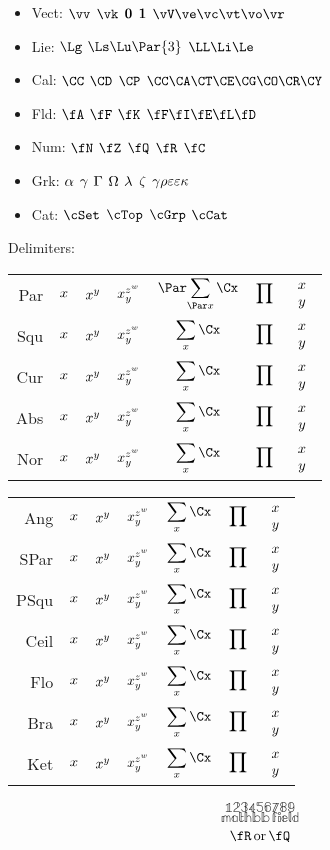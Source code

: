 \documentclass[11pt]{article}
\begin{document}
\mkPsetTitle{}

\newcommand{\alphabet}{Aa\,Bb\,Cc\,Dd\,Ee\,Ff\,Gg\,Hh\,Ii\,Jj\,Kk\,Ll\,Mm}
\newcommand{\alphabett}{Nn\,Oo\,Pp\,Qq\,Rr\,Ss\,Tt\,Uu\,Vv\,Ww\,Xx\,Yy\,Zz}
\newcommand{\numbers}{1\,2\,3\,4\,5\,6\,7\,8\,9\,0}
\newcommand{\greek}
    {A\al\,B\be\,\Ga\ga\,\De\de\,E\ep\,Z\ze\,H\eta\,\Te\te\,I\iota\,K\ka\,\lla\la\,M\mu}
\newcommand{\greekk}
    {N\nu\,\Xi\xi\,Oo\,\Pi\pi\,P\rho\,\Si\si\vsi\,T\tau\,Y\ups\,\Ph\phi\ph\,X\chi\,\Ps\ps\,\Om\om}

\begin{itemize}
    \item Vect: $\vv$ $\vk$ $\bm{\mathrm{0}}$ $\bm{\mathrm{1}}$ $\vV\ve\vc\vt\vo\vr$
    \item Lie: $\Lg$ $\Ls\Lu\Par{3}$ $\LL\Li\Le$
    \item Cal: $\CC$ $\CD$ $\CP$ $\CC\CA\CT\CE\CG\CO\CR\CY$
    \item Fld: $\fA$ $\fF$ $\fK$ $\fF\fI\fE\fL\fD$
    \item Num: $\N$ $\Z$ $\Q$ $\R$ $\C$
    \item Grk: $\alpha$ $\gamma$ $\Gamma$ $\Omega$ $\lambda$ $\zeta$ $\gamma\rho\varepsilon\varepsilon\kappa$
    \item Cat: $\cSet$ $\cTop$ $\cGrp$ $\cCat$
\end{itemize}

\newcommand{\deltest}[1]{%
#1 
& $\call{#1}{x}$ 
& $\call{#1}{x^y}$
& $x_{\call{#1}{y}}^{z^{\call{#1}{w}}}$
& $\displaystyle{\call{#1}{\sum_{\call{#1}{x}} \Cx}}$ 
& $\displaystyle{\call{#1}{\prod}}$
& $\call{#1}{\begin{array}{c}x\\y\end{array}}$ \\[6ex]
}

Delimiters:
\begin{center}
\begin{tabular}{r|cccccc}
    \deltest{Par} 
    \deltest{Squ}
    \deltest{Cur}
    \deltest{Abs}
    \deltest{Nor}
\end{tabular}
\begin{tabular}{r|cccccc}
    \deltest{Ang}
    \deltest{SPar}
    \deltest{PSqu}
    \deltest{Ceil}
    \deltest{Flo}
    \deltest{Bra}
    \deltest{Ket}
\end{tabular}
\end{center}

\[ \mathbb{123456789} \]
\[ \mathbb{mathbb\,field} \]
\[ \R \OR \Q \]
\end{document}

